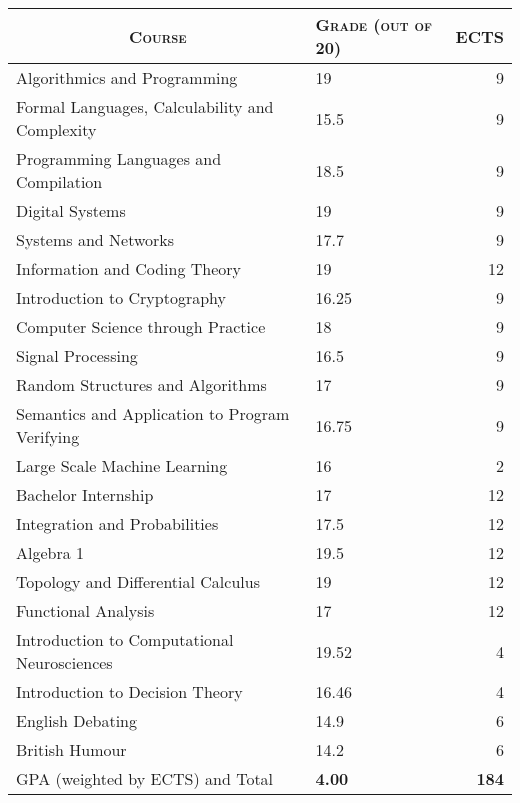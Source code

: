 \documentclass[a4paper,10pt]{article} %
\begin{document}
\begin{center}
\begin{tabular}{llr}
  \multicolumn{1}{c}{\textsc{Course}} & \textsc{Grade (out of 20)}&\textsc{ECTS}\\ \hline
  Algorithmics and Programming & 19 & 9 \\
  Formal Languages, Calculability and Complexity & 15.5 & 9 \\
  Programming Languages and Compilation & 18.5 & 9 \\
  Digital Systems & 19 & 9 \\
  Systems and Networks & 17.7 & 9 \\
  Information and Coding Theory & 19 & 12 \\
  Introduction to Cryptography & 16.25 & 9 \\
  Computer Science through Practice & 18 & 9 \\
  Signal Processing & 16.5 & 9 \\
  Random Structures and Algorithms & 17 & 9 \\
  Semantics and Application to Program Verifying & 16.75 & 9 \\
  Large Scale Machine Learning & 16 & 2 \\
  Bachelor Internship & 17 & 12 \\
  \hline
  Integration and Probabilities & 17.5 & 12 \\
  Algebra 1 & 19.5 & 12 \\
  Topology and Differential Calculus & 19 & 12 \\
  Functional Analysis & 17 & 12 \\
  \hline
  Introduction to Computational Neurosciences & 19.52 & 4 \\
  Introduction to Decision Theory & 16.46 & 4 \\
  \hline
  English Debating & 14.9 & 6 \\
  British Humour & 14.2 & 6 \\
  \hline
  \textsc{GPA} (weighted by \textsc{ECTS}) and Total & \textbf{4.00} & \textbf{184}
\end{tabular}
\end{center}

\end{document}
